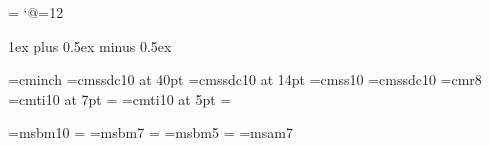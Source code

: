 \output={\normaloutput}
\newbox\partialpage \newdimen\origvsize \newif\ifrigid
\def\begindoublecolumns{\global\origvsize=\vsize \begingroup
  \output={\global\setbox\partialpage=\vbox{\unvbox255\kern0pt}}\eject
  \output={\doublecolumnout} \hsize=\colwidth \dimen@=\pageheight
  \advance\dimen@ by-\ht\partialpage \multiply\dimen@ by2
  \ifdim\dimen@<2\baselineskip \dimen@=2\baselineskip\fi
  \vsize=\dimen@}
\def\enddoublecolumns{\output={\balancecolumns}\eject
  \endgroup \global\vsize=\origvsize \pagegoal=\vsize}
\def\doublecolumnout{\splittopskip=\topskip \splitmaxdepth=\maxdepth
  \setbox0=\vsplit255 to.5\vsize \setbox2=\vsplit255 to.5\vsize
  \onepageout\pagesofar \global\vsize=2\pageheight
  \unvbox255 \penalty\outputpenalty}
\def\pagesofar{\unvbox\partialpage
  \wd0=\hsize \wd2=\hsize
  \hbox to\pagewidth{\valign{##\vfill\cr%
  \vbox{\unvbox0}\cr\noalign{\hfil\separator\hfil}\vbox{\unvbox2}\cr}}}
\def\norulesep{\let\separator=\relax}
\def\rulesep{\let\separator=\vrule}
\let\separator=\relax
\def\balancecolumns{\setbox0=\vbox{\unvbox255} \dimen@=\ht0
  \advance\dimen@ by\topskip \advance\dimen@ by-\baselineskip
  \divide\dimen@ by2 \splittopskip=\topskip
  {\vbadness=10000 \loop \global\setbox3=\copy0
    \global\setbox1=\vsplit3 to\dimen@
    \ifdim\ht3>\dimen@ \global\advance\dimen@ by1pt \repeat}
  \ifrigid
    \setbox0=\vtop{\unvbox1}
    \setbox2=\vtop{\unvbox3}
  \else
    \setbox0=\vbox to\dimen@{\unvbox1}
    \setbox2=\vbox to\dimen@{\dimen2=\dp3 \unvbox3\kern-\dimen2 \vfil}
  \fi
  \global\vsize=\origvsize \pagesofar}
\catcode`@=12

\colwidth 19pc
\newdimen\manindent      \manindent 3pc
\newdimen\smallmanindent \smallmanindent 1pc
\parskip 1ex plus 0.5ex minus 0.5ex
\parindent 0pt

\font\inchhigh=cminch
\font\titlefont=cmssdc10 at 40pt
\font\secfont=cmssdc10 at 14pt
\font\sf=cmss10
\font\bsf=cmssdc10
\font\smallrom=cmr8
\font\sevenit=cmti10 at 7pt \scriptfont\itfam=\sevenit
\font\fiveit=cmti10 at 5pt  \scriptscriptfont\itfam=\fiveit

\newfam\msbfam \def\Bbb{\fam\msbfam}
\font\tenmsb=msbm10         \textfont\msbfam=\tenmsb
\font\sevenmsb=msbm7        \scriptfont\msbfam=\sevenmsb
\font\fivemsb=msbm5         \scriptscriptfont\msbfam=\fivemsb
\font\sevenmsa=msam7

